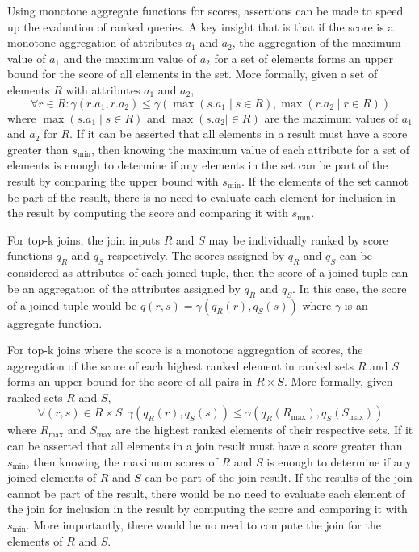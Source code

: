 Using monotone aggregate functions for scores, assertions can be made to speed up the evaluation of ranked queries. A key insight that is that if the score is a monotone aggregation of attributes \(a_1\) and \(a_2\), the aggregation of the maximum value of \(a_1\) and the maximum value of \(a_2\) for a set of elements forms an upper bound for the score of all elements in the set. More formally, given a set of elements \(R\) with attributes \(a_1\) and \(a_2\),
\[
  \forall r \in R :
  \gamma(r.a_1, r.a_2)
  \leq
  \gamma(\max(s.a_1 \mid s \in R), \max(r.a_2 \mid r \in R))
\]
where \(\max(s.a_1 \mid s \in R)\) and \(\max(s.a_2 \mid \in R)\) are the maximum values of \(a_1\) and \(a_2\) for \(R\). If it can be asserted that all elements in a result must have a score greater than \(s_{\min}\), then knowing the maximum value of each attribute for a set of elements is enough to determine if any elements in the set can be part of the result by comparing the upper bound with \(s_{\min}\). If the elements of the set cannot be part of the result, there is no need to evaluate each element for inclusion in the result by computing the score and comparing it with \(s_{\min}\).

For top-k joins, the join inputs \(R\) and \(S\) may be individually ranked by score functions \(q_R\) and \(q_S\) respectively. The scores assigned by \(q_R\) and \(q_S\) can be considered as attributes of each joined tuple, then the score of a joined tuple can be an aggregation of the attributes assigned by \(q_R\) and \(q_S\). In this case, the score of a joined tuple would be \(q(r, s) = \gamma(q_R(r), q_S(s))\) where \(\gamma\) is an aggregate function.

For top-k joins where the score is a monotone aggregation of scores, the aggregation of the score of each highest ranked element in ranked sets \(R\) and \(S\) forms an upper bound for the score of all pairs in \(R \times S\). More formally, given ranked sets \(R\) and \(S\),
\[
  \forall (r, s) \in R \times S :
  \gamma(q_R(r), q_S(s))
  \leq
  \gamma(q_R(R_{\max}), q_S(S_{\max}))
\]
where \(R_{\max}\) and \(S_{\max}\) are the highest ranked elements of their respective sets. If it can be asserted that all elements in a join result must have a score greater than \(s_{\min}\), then knowing the maximum scores of \(R\) and \(S\) is enough to determine if any joined elements of \(R\) and \(S\) can be part of the join result. If the results of the join cannot be part of the result, there would be no need to evaluate each element of the join for inclusion in the result by computing the score and comparing it with \(s_{\min}\). More importantly, there would be no need to compute the join for the elements of \(R\) and \(S\).

